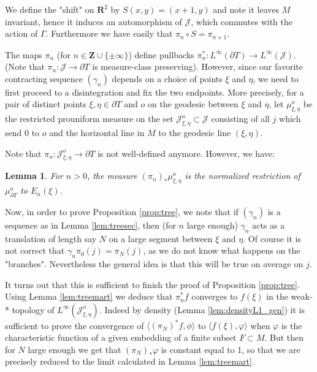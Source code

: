 \documentclass[a4paper, 11pt]{article}
\theoremstyle{plain}
\newtheorem{lemma}[proposition]{Lemma}
\theoremstyle{definition}
\theoremstyle{remark}
\newcommand{\RR}{\mathbf{R}}                          %
\newcommand{\ZZ}{\mathbf{Z}}                          %
\newcommand{\JR}{\mathcal J}
\begin{document}
We define the "shift" on $\RR^2$ by $S(x,y)=(x+1,y)$ and note it leaves $M$ invariant, hence it induces an automorphism of $\JR$, which commutes with the action of $\Gamma$. Furthermore we have easily that $\pi_n\circ S=\pi_{n+1}$. 

The maps $\pi_n$ (for $n\in \ZZ\cup\{\pm\infty\}$) define pullbacks $\pi_n^*:L^\infty(\partial T)\to L^\infty(\JR)$. (Note that $\pi_n:\JR\to \partial T$ is measure-class preserving). However, since our favorite contracting sequence $(\gamma_n)$ depends on a choice of points $\xi$ and $\eta$, we need to first proceed to a disintegration and fix the two endpoints.  More precisely, for a pair of distinct points $\xi,\eta\in\partial T$ and $o$ on the geodesic between $\xi$ and $\eta$, let $\mu_{\xi,\eta}^o$ be the restricted prouniform measure on the set $\JR_{\xi,\eta}^o\subset \JR$ consisting of all $j$ which send $0$ to $o$ and the horizontal  line in $M$ to the geodesic line $(\xi,\eta)$.

Note that $\pi_n:\JR_{\xi,\eta}^o\to \partial T$ is not well-defined anymore. However, we have:

\begin{lemma}
    For $n>0$, the measure $(\pi_n)_*\mu_{\xi,\eta}^o$ is the normalized restriction of $\mu_{\partial T}^o$ to $E_n(\xi)$. 
\end{lemma}

Now, in order to prove Proposition \ref{prop:tree}, we note that if $(\gamma_n)$ is a sequence as in Lemma \ref{lem:treesec}, then (for $n$ large enough) $\gamma_n$ acts as a translation of length say $N$ on a large segment between $\xi$ and $\eta$. Of course it is not correct that $\gamma_n \pi_0 (j)=\pi_N(j)$, as we do not know what happens on the "branches". Nevertheless the general idea is that this will be true on average on $j$.

It turns out that this is sufficient to finish the proof of Proposition \ref{prop:tree}. 
Using Lemma \ref{lem:treemart} we deduce that $\pi_n^* f$ converges to $f(\xi)$ in the weak-* topology of  $L^\infty(\JR_{\xi,\eta}^o)$. Indeed by density (Lemma \ref{lem:densityL1_gen}) it is sufficient to prove the convergence of $\langle (\pi_N)^* f,\phi \rangle$ to $\langle f(\xi),\varphi\rangle$ when $\varphi$ is the characteristic function of a given embedding of a finite subset  $F\subset M$. But then for $N$ large enough we get that $(\pi_N)_*\varphi$ is constant equal to 1, so that we are precisely reduced to the limit calculated in Lemma \ref{lem:treemart}.
\end{document}
